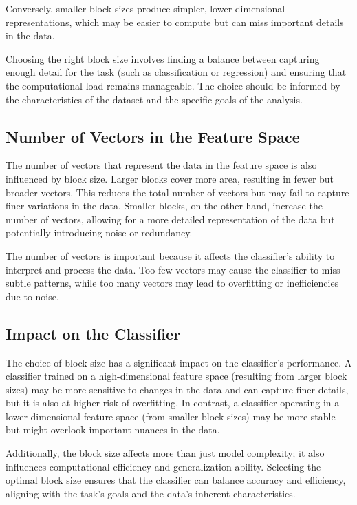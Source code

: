 \documentclass[conference,12pt]{IEEEtran}
\begin{document}
Conversely, smaller block sizes produce simpler, lower-dimensional representations, which may be easier to compute but can miss important details in the data.

Choosing the right block size involves finding a balance between capturing enough detail for the task (such as classification or regression) and ensuring that the computational load remains manageable. The choice should be informed by the characteristics of the dataset and the specific goals of the analysis.

\subsection{Number of Vectors in the Feature Space}
The number of vectors that represent the data in the feature space is also influenced by block size. Larger blocks cover more area, resulting in fewer but broader vectors. This reduces the total number of vectors but may fail to capture finer variations in the data. Smaller blocks, on the other hand, increase the number of vectors, allowing for a more detailed representation of the data but potentially introducing noise or redundancy.

The number of vectors is important because it affects the classifier’s ability to interpret and process the data. Too few vectors may cause the classifier to miss subtle patterns, while too many vectors may lead to overfitting or inefficiencies due to noise.

\subsection{Impact on the Classifier}
The choice of block size has a significant impact on the classifier's performance. A classifier trained on a high-dimensional feature space (resulting from larger block sizes) may be more sensitive to changes in the data and can capture finer details, but it is also at higher risk of overfitting. In contrast, a classifier operating in a lower-dimensional feature space (from smaller block sizes) may be more stable but might overlook important nuances in the data.

Additionally, the block size affects more than just model complexity; it also influences computational efficiency and generalization ability. Selecting the optimal block size ensures that the classifier can balance accuracy and efficiency, aligning with the task's goals and the data's inherent characteristics.
\\[1em]
\end{document}
